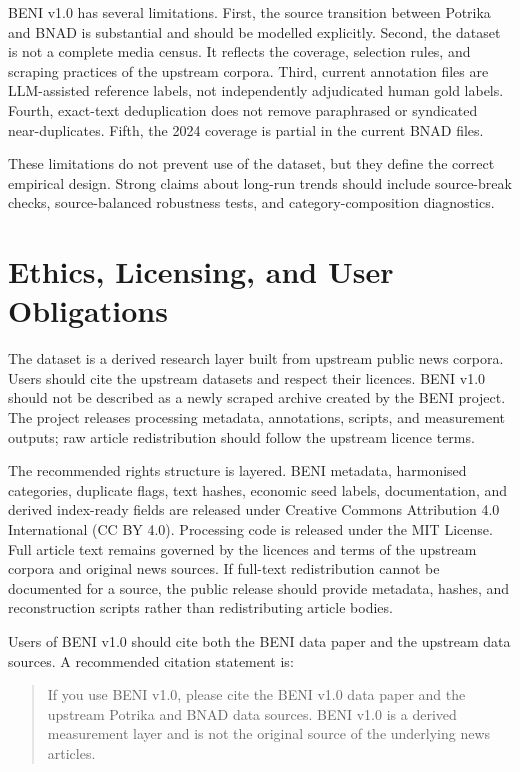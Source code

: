 \documentclass[11pt]{article}
\begin{document}
BENI v1.0 has several limitations. First, the source transition between Potrika and BNAD is substantial and should be modelled explicitly. Second, the dataset is not a complete media census. It reflects the coverage, selection rules, and scraping practices of the upstream corpora. Third, current annotation files are LLM-assisted reference labels, not independently adjudicated human gold labels. Fourth, exact-text deduplication does not remove paraphrased or syndicated near-duplicates. Fifth, the 2024 coverage is partial in the current BNAD files.

These limitations do not prevent use of the dataset, but they define the correct empirical design. Strong claims about long-run trends should include source-break checks, source-balanced robustness tests, and category-composition diagnostics.

\section{Ethics, Licensing, and User Obligations}

The dataset is a derived research layer built from upstream public news corpora. Users should cite the upstream datasets and respect their licences. BENI v1.0 should not be described as a newly scraped archive created by the BENI project. The project releases processing metadata, annotations, scripts, and measurement outputs; raw article redistribution should follow the upstream licence terms.

The recommended rights structure is layered. BENI metadata, harmonised categories, duplicate flags, text hashes, economic seed labels, documentation, and derived index-ready fields are released under Creative Commons Attribution 4.0 International (CC BY 4.0). Processing code is released under the MIT License. Full article text remains governed by the licences and terms of the upstream corpora and original news sources. If full-text redistribution cannot be documented for a source, the public release should provide metadata, hashes, and reconstruction scripts rather than redistributing article bodies.

Users of BENI v1.0 should cite both the BENI data paper and the upstream data sources. A recommended citation statement is:

\begin{quote}
If you use BENI v1.0, please cite the BENI v1.0 data paper and the upstream Potrika and BNAD data sources. BENI v1.0 is a derived measurement layer and is not the original source of the underlying news articles.
\end{quote}
\end{document}
